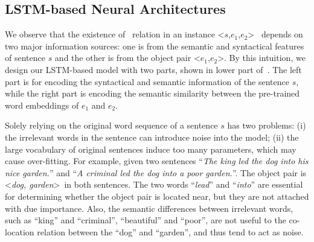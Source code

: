 \subsection{LSTM-based Neural Architectures}
We observe that the existence of \lnear~relation in 
an instance \textless $s$,$e_1$,$e_2$\textgreater~ depends 
on two major information sources: one is from the semantic and syntactical features of sentence $s$ 
and the other is from the object pair \textless$e_1$,$e_2$\textgreater.
By this intuition, we design our LSTM-based model with two parts, shown in lower part of~.
The left part is for encoding the syntactical and semantic information of the sentence $s$, while the right part is encoding the semantic similarity between the pre-trained word embeddings of $e_1$ and $e_2$.

Solely relying on the original word sequence of a sentence $s$ has two problems:
(i) the irrelevant words in the sentence can introduce noise into the model; 
(ii) the large vocabulary of original sentences induce too many parameters, which may cause over-fitting. For example, given two sentences 
	``\textit{The king led the dog into his nice garden.}'' and 
	``\textit{A criminal led the dog into a poor garden.}''. 
	The object pair is \textless \textit{dog, garden}\textgreater~in 
	both sentences.
	The two words ``\textit{lead}'' and ``\textit{into}'' are essential
	for determining whether the object pair is located near, but they 
are not attached with due importance. 
Also, the semantic differences between irrelevant words, such as ``king'' and ``criminal'', ``beautiful'' and ``poor'', are not useful to the co-location
relation between the ``dog'' and ``garden'', and 
thus tend to act as noise.

